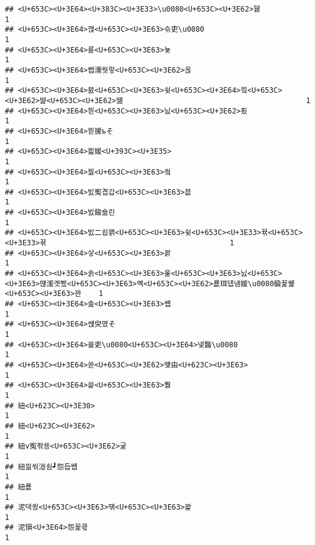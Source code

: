 \documentclass[]{article}
\begin{document}
\begin{verbatim}
## <U+653C><U+3E64><U+383C><U+3E33>\u0080<U+653C><U+3E62>뒗                                                    1
## <U+653C><U+3E64>깭<U+653C><U+3E63>슦吏\u0080                                                    1
## <U+653C><U+3E64>룓<U+653C><U+3E63>뇿                                                            1
## <U+653C><U+3E64>봽濡쒓렇<U+653C><U+3E62>옩                                                      1
## <U+653C><U+3E64>븘<U+653C><U+3E63>슂<U+653C><U+3E64>빀<U+653C><U+3E62>땲<U+653C><U+3E62>떎                                          1
## <U+653C><U+3E64>븯<U+653C><U+3E63>닔<U+653C><U+3E62>룄                                                      1
## <U+653C><U+3E64>븯援ъそ                                                            1
## <U+653C><U+3E64>븳媛<U+393C><U+3E35>                                                            1
## <U+653C><U+3E64>븷<U+653C><U+3E63>씤                                                            1
## <U+653C><U+3E64>빐寃곕갑<U+653C><U+3E63>븞                                                      1
## <U+653C><U+3E64>빐鍮숆린                                                            1
## <U+653C><U+3E64>빐二쇱꽭<U+653C><U+3E63>슂<U+653C><U+3E33>뀪<U+653C><U+3E33>뀪                                          1
## <U+653C><U+3E64>샇<U+653C><U+3E63>꽑                                                            1
## <U+653C><U+3E64>솕<U+653C><U+3E63>옱<U+653C><U+3E63>닔<U+653C><U+3E63>떊湲곗삤<U+653C><U+3E63>옉<U+653C><U+3E62>룞珥덉냼媛\u0080鍮꾩썙<U+653C><U+3E63>꽌    1
## <U+653C><U+3E64>솚<U+653C><U+3E63>썝                                                            1
## <U+653C><U+3E64>썑臾몄そ                                                            1
## <U+653C><U+3E64>쑕吏\u0080<U+653C><U+3E64>넻醫\u0080                                            1
## <U+653C><U+3E64>쓷<U+653C><U+3E62>뱾由<U+623C><U+3E63>                                                      1
## <U+653C><U+3E64>씉<U+653C><U+3E63>뿰                                                            1
## 紐<U+623C><U+3E30>                                                                  1
## 紐<U+623C><U+3E62>                                                                  1
## 紐v寃좎쑝<U+653C><U+3E62>굹                                                         1
## 紐낆씪洹쇰┛怨듭썝                                                      1
## 紐룞                                                                    1
## 泥댁쑁<U+653C><U+3E63>떆<U+653C><U+3E63>꽕                                                      1
## 泥愼<U+3E64>怨꾩쿇                                                            1

\end{verbatim}
\end{document}
